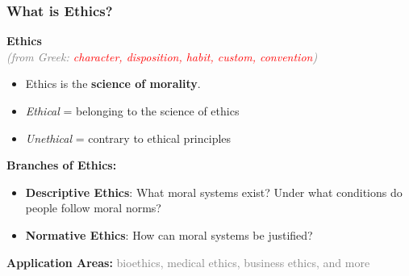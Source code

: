 \documentclass[aspectratio=169, 10pt]{beamer}
\begin{document}
\begin{frame}
\frametitle{What is Ethics?}

\begin{center}
  \textcolor{WHUblue}{\Large\textbf{Ethics}}\\[0.5em]
  \textcolor{gray}{\textit{(from Greek: \textcolor{red}{character, disposition, habit, custom, convention})}}
\end{center}

\vspace{1em}

\begin{itemize}
  \item Ethics is the \textbf{science of morality}.
  \item \textit{Ethical} = belonging to the science of ethics
  \item \textit{Unethical} = contrary to ethical principles
\end{itemize}

\vspace{1em}

\textbf{Branches of Ethics:}
\begin{itemize}
  \item \textcolor{WHUblue}{\textbf{Descriptive Ethics}}: What moral systems exist? Under what conditions do people follow moral norms?
  \item \textcolor{WHUblue}{\textbf{Normative Ethics}}: How can moral systems be justified?
\end{itemize}

\vspace{1em}

\textbf{Application Areas:} \textcolor{gray}{bioethics, medical ethics, business ethics, and more}

\vspace{0.5em}
\hfill{}
\end{frame}
\end{document}
